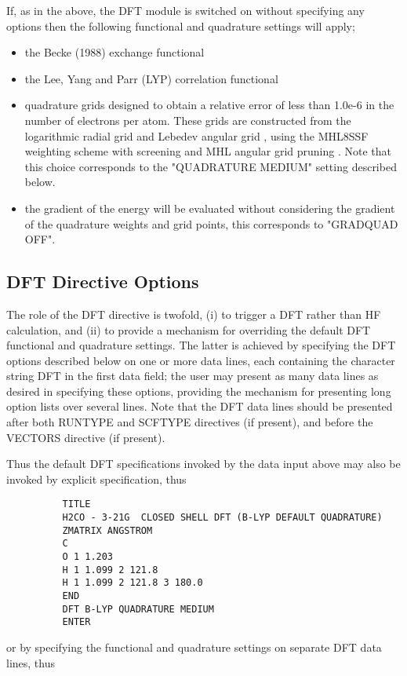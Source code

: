 \documentclass[11pt,fleqn]{article}
\begin{document}
If, as in the above, the DFT module is switched on without specifying
any options then the following functional and quadrature settings will
apply;
\begin{itemize}
\item the Becke (1988) exchange functional \cite{becke88}
\item the Lee, Yang and Parr (LYP) correlation functional \cite{lyp}
\item quadrature grids designed to obtain a relative error of less than
1.0e-6 in the number of electrons per atom. These grids are constructed
from the logarithmic radial grid \cite{mura96,murray93} and
Lebedev angular grid \cite{lebe99}, using the MHL8SSF weighting scheme with
screening and MHL angular grid pruning \cite{murray93}.
Note that this choice corresponds to the "QUADRATURE MEDIUM" setting
described below.
\item the gradient of the energy will be evaluated without considering the
gradient of the quadrature weights and grid points, this corresponds to
"GRADQUAD OFF".
\end{itemize}

\subsection{DFT Directive Options}

The role of the DFT directive is twofold, (i) to trigger a DFT rather
than HF calculation, and (ii) to provide a mechanism for overriding the
default DFT functional and quadrature settings.  The latter is achieved
by specifying the DFT options described below on one or more data
lines, each containing the character string DFT in the first data
field; the user may present as many data lines as desired in specifying
these options, providing the mechanism for presenting long option lists
over several lines.  Note that the DFT data lines should be presented
after both RUNTYPE and SCFTYPE directives (if present), and before the
VECTORS directive (if present).

Thus the default DFT specifications invoked by the data input above may
also be invoked by explicit specification, thus

{
\footnotesize
\begin{verbatim}
          TITLE
          H2CO - 3-21G  CLOSED SHELL DFT (B-LYP DEFAULT QUADRATURE)
          ZMATRIX ANGSTROM
          C
          O 1 1.203
          H 1 1.099 2 121.8
          H 1 1.099 2 121.8 3 180.0
          END
          DFT B-LYP QUADRATURE MEDIUM
          ENTER
\end{verbatim}
}
or by specifying the functional and quadrature settings on separate
DFT data lines, thus
\end{document}
